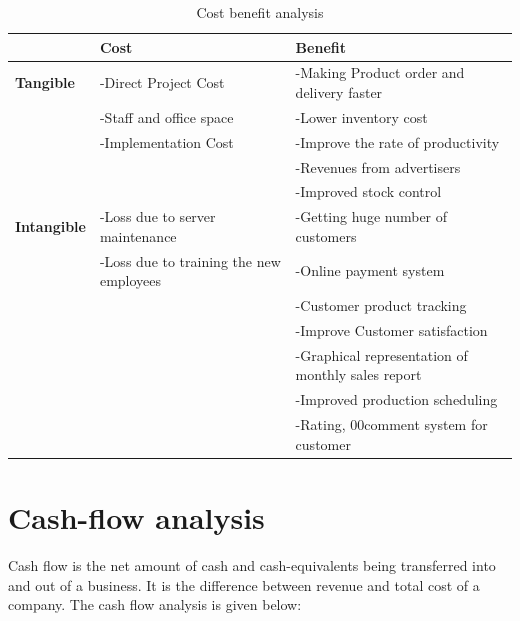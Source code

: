   \begin{table}[h]
  \begin{center}

\begin{tabular}{ |p{5cm}|p{5cm}|p{5cm}|  }

 \hline
  &\textbf{Cost}&\textbf{Benefit}\\
 \hline
\textbf{Tangible}  &-Direct Project Cost &-Making Product order and delivery faster\\
           &-Staff and office space&-Lower inventory cost\\
           &-Implementation Cost&-Improve the rate of productivity\\
           &&-Revenues from advertisers\\
           &&-Improved stock control\\
\hline
\textbf{Intangible}   &-Loss due to server maintenance &-Getting huge number of customers\\
             &-Loss due to training the new employees&-Online payment system\\
             &&-Customer product tracking\\
             &&-Improve Customer satisfaction\\
             &&-Graphical representation of monthly sales report\\
             &&-Improved production scheduling\\
             &&-Rating, 00comment system for customer\\
 \hline

\end{tabular}
\end{center}
\caption{Cost benefit analysis}


\end{table}

\newpage

\section{Cash-flow analysis}
Cash flow is the net amount of cash and cash-equivalents being transferred into and out of a business. It is the difference between revenue and total cost of a company. The cash flow analysis is given below:

